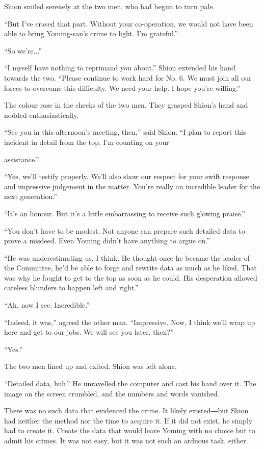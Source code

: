 Shion smiled serenely at the two men, who had begun to turn pale.

``But I've erased that part. Without your co-operation, we would not
have been able to bring Yoming-san's crime to light. I'm grateful.''

``So we're...''

``I myself have nothing to reprimand you about.'' Shion extended his
hand towards the two. ``Please continue to work hard for No. 6. We must
join all our forces to overcome this difficulty. We need your help. I
hope you're willing.''

The colour rose in the cheeks of the two men. They grasped Shion's hand
and nodded enthusiastically.

``See you in this afternoon's meeting, then,'' said Shion. ``I plan to
report this incident in detail from the top. I'm counting on your~

assistance.''

``Yes, we'll testify properly. We'll also show our respect for your
swift response and impressive judgement in the matter. You're really an
incredible leader for the next generation.''

``It's an honour. But it's a little embarrassing to receive such glowing
praise.''

``You don't have to be modest. Not anyone can prepare such detailed data
to prove a misdeed. Even Yoming didn't have anything to argue on.''

``He was underestimating us, I think. He thought once he became the
leader of the Committee, he'd be able to forge and rewrite data as much
as he liked. That was why he fought to get to the top as soon as he
could. His desperation allowed careless blunders to happen left and
right.''

``Ah, now I see. Incredible.''

``Indeed, it was,'' agreed the other man. ``Impressive. Now, I think
we'll wrap up here and get to our jobs. We will see you later, then?''

``Yes.''

The two men lined up and exited. Shion was left alone.

``Detailed data, huh.'' He unravelled the computer and cast his hand
over it. The image on the screen crumbled, and the numbers and words
vanished.

There was no such data that evidenced the crime. It likely existed―but
Shion had neither the method nor the time to acquire it. If it did not
exist, he simply had to create it. Create the data that would leave
Yoming with no choice but to admit his crimes. It was not easy, but it
was not such an arduous task, either.

